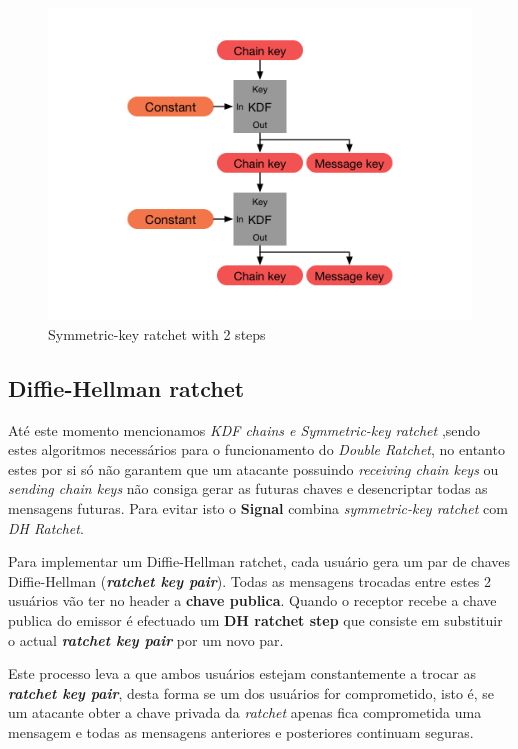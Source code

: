 \begin{figure}[H]
\begin{center}
\includegraphics[width=12cm]{img/skRatchet.png}
\caption{Symmetric-key ratchet with 2 steps}
\label{diagram:skRatchet}
\centering
\end{center}
\end{figure}

\subsection{Diffie-Hellman ratchet}\label{sec:dhratchet}
Até este momento mencionamos \textit{KDF chains e Symmetric-key ratchet} ,sendo estes algoritmos necessários para o funcionamento do \textit{Double Ratchet}, no entanto estes por si só não garantem que um atacante possuindo \textit{receiving chain keys} ou \textit{sending chain keys} não consiga gerar as futuras chaves e desencriptar todas as mensagens futuras. Para evitar isto o \textbf{Signal} combina \textit{symmetric-key ratchet} com \textit{DH Ratchet}.

Para implementar um Diffie-Hellman ratchet, cada usuário gera um par de chaves Diffie-Hellman (\textit{\textbf{ratchet key pair}}). Todas as mensagens trocadas entre estes 2 usuários vão ter no header a \textbf{chave publica}. Quando o receptor recebe a chave publica do emissor é efectuado um \textbf{DH ratchet step} que consiste em substituir o actual \textbf{\textit{ratchet key pair}} por um novo par.

Este processo leva a que ambos usuários estejam constantemente a trocar as \textbf{\textit{ratchet key pair}}, desta forma se um dos usuários for comprometido, isto é, se um atacante obter a chave privada da \textit{ratchet} apenas fica comprometida uma mensagem e todas as mensagens anteriores e posteriores continuam seguras.

